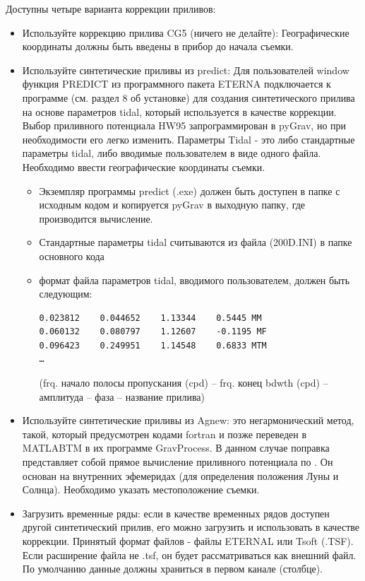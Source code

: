 Доступны четыре варианта коррекции приливов:
\begin{itemize}
    \item Используйте коррекцию прилива CG5 (ничего не делайте): Географические
    координаты должны быть введены в прибор до начала съемки.

    \item Используйте синтетические приливы из predict: Для пользователей window
    функция PREDICT из программного пакета ETERNA \cite{wenzel_1996} подключается к
    программе (см. раздел 8 об установке) для создания синтетического прилива на
    основе параметров tidal, который используется в качестве коррекции. Выбор
    приливного потенциала HW95 \cite{hartmann_hw95_1995} запрограммирован в
    pyGrav, но при необходимости его легко изменить. Параметры Tidal - это либо
    стандартные параметры tidal, либо вводимые пользователем в виде одного
    файла. Необходимо ввести географические координаты съемки.

    \begin{itemize}
        \item Экземпляр программы predict (.exe) должен быть доступен в папке с
        исходным кодом и копируется pyGrav в выходную папку, где производится
        вычисление.

        \item Стандартные параметры tidal считываются из файла (200D.INI) в
        папке основного кода

        \item формат файла параметров tidal, вводимого пользователем, должен
        быть следующим:

        \begin{verbatim}
0.023812    0.044652    1.13344    0.5445 MM
0.060132    0.080797    1.12607    -0.1195 MF
0.096423    0.249951    1.14548    0.6833 MTM
…
        \end{verbatim}
        (frq. начало полосы пропускания (cpd) – frq. конец bdwth (cpd) –
        амплитуда – фаза – название прилива)
        
    \end{itemize}

    \item Используйте синтетические приливы из Agnew: это негармонический метод,
    такой, который предусмотрен кодами fortran \cite{agnew_2007, agnew_2012} и позже
    переведен в MATLABTM \cite{cattin_gravprocess_2015} в их программе GravProcess. В
    данном случае поправка представляет собой прямое вычисление приливного
    потенциала по \cite{munk_tidal_1966}. Он основан на внутренних эфемеридах
    (для определения положения Луны и Солнца). Необходимо указать местоположение
    съемки.

    \item Загрузить временные ряды: если в качестве временных рядов доступен
    другой синтетический прилив, его можно загрузить и использовать в качестве
    коррекции. Принятый формат файлов - файлы ETERNAL или Tsoft (.TSF). Если
    расширение файла не .tsf, он будет рассматриваться как внешний файл. По
    умолчанию данные должны храниться в первом канале (столбце).
    
\end{itemize}

